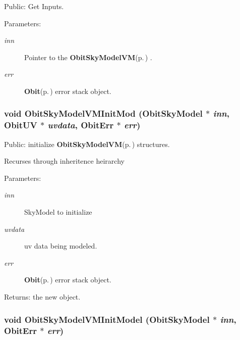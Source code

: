 Public: Get Inputs. 

\begin{Desc}
\item[Parameters:]
\begin{description}
\item[{\em inn}]Pointer to the {\bf Obit\-Sky\-Model\-VM}{\rm (p.\,\pageref{structObitSkyModelVM})} . \item[{\em err}]{\bf Obit}{\rm (p.\,\pageref{structObit})} error stack object. \end{description}
\end{Desc}
\subsubsection{\setlength{\rightskip}{0pt plus 5cm}void Obit\-Sky\-Model\-VMInit\-Mod ({\bf Obit\-Sky\-Model} $\ast$ {\em inn}, {\bf Obit\-UV} $\ast$ {\em uvdata}, {\bf Obit\-Err} $\ast$ {\em err})}\label{ObitSkyModelVM_8c_a16}


Public: initialize {\bf Obit\-Sky\-Model\-VM}{\rm (p.\,\pageref{structObitSkyModelVM})} structures. 

Recurses through inheritence heirarchy \begin{Desc}
\item[Parameters:]
\begin{description}
\item[{\em inn}]Sky\-Model to initialize \item[{\em uvdata}]uv data being modeled. \item[{\em err}]{\bf Obit}{\rm (p.\,\pageref{structObit})} error stack object. \end{description}
\end{Desc}
\begin{Desc}
\item[Returns:]the new object. \end{Desc}
\subsubsection{\setlength{\rightskip}{0pt plus 5cm}void Obit\-Sky\-Model\-VMInit\-Model ({\bf Obit\-Sky\-Model} $\ast$ {\em inn}, {\bf Obit\-Err} $\ast$ {\em err})}\label{ObitSkyModelVM_8c_a18}


